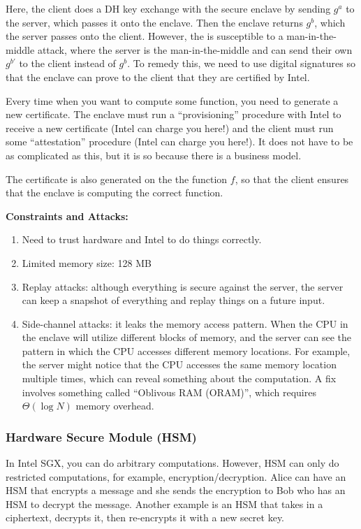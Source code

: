 Here, the client does a DH key exchange with the secure enclave by sending $g^a$ to the server, which passes it onto the enclave. Then the enclave returns $g^b$, which the server passes onto the client. However, the is susceptible to a man-in-the-middle attack, where the server is the man-in-the-middle and can send their own $g^{b'}$ to the client instead of $g^b$. To remedy this, we need to use digital signatures so that the enclave can prove to the client that they are certified by Intel.

Every time when you want to compute some function, you need to generate a new certificate. The enclave must run a ``provisioning'' procedure with Intel to receive a new certificate (Intel can charge you here!) and the client must run some ``attestation'' procedure (Intel can charge you here!). It does not have to be as complicated as this, but it is so because there is a business model.

The certificate is also generated on the the function $f$, so that the client ensures that the enclave is computing the correct function.

\textbf{Constraints and Attacks:}

\begin{enumerate}
    \item Need to trust hardware and Intel to do things correctly.
    \item Limited memory size: 128 MB
    \item Replay attacks: although everything is secure against the server, the server can keep a snapshot of everything and replay things on a future input.
    \item Side-channel attacks: it leaks the memory access pattern. When the CPU in the enclave will utilize different blocks of memory, and the server can see the pattern in which the CPU accesses different memory locations. For example, the server might notice that the CPU accesses the same memory location multiple times, which can reveal something about the computation. A fix involves something called ``Oblivous RAM (ORAM)'', which requires $\Theta (\log N)$ memory overhead.
\end{enumerate}

\subsubsection{Hardware Secure Module (HSM)}

In Intel SGX, you can do arbitrary computations. However, HSM can only do restricted computations, for example, encryption/decryption. Alice can have an HSM that encrypts a message and she sends the encryption to Bob who has an HSM to decrypt the message. Another example is an HSM that takes in a ciphertext, decrypts it, then re-encrypts it with a new secret key.

